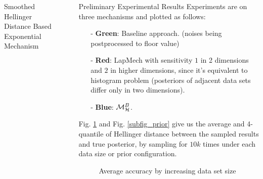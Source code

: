 \documentclass[final,hyperref={pdfpagelabels=false}]{beamer}
\begin{document}
\begin{frame}[t]
\begin{columns}[t]
\begin{column}{.485\textwidth}
\begin{block}{Smoothed Hellinger Distance Based Exponential Mechanism}
\end{block}


\end{column} %

\begin{column}{.01\textwidth}\end{column} %
 
\begin{column}{.485\textwidth} %






\begin{block}{Preliminary Experimental Results}
Experiments are on three mechanisms and plotted as follows:
\begin{itemize}
  \item[-] \textbf{Green}: Baseline approach. (noises being postprocessed to floor value) %
  \item[-] \textbf{Red}: LapMech with sensitivity $1$ in 2 dimensions and $2$ in higher dimensions, since it's equivalent to histogram problem 
  (posteriors of adjacent data sets differ only in two dimensions).
  \item[-] \textbf{Blue}: $\mathcal{M}^{B}_{\mathcal{H}}$.
\end{itemize}
  Fig. \ref{fig_sampling} and Fig. \ref{subfig_prior} give us the average and 4-quantile of Hellinger distance between the sampled results and true posterior, by sampling for $10k$ times under each data size or prior configuration.

\begin{figure}[H]
\begin{center}
\centering
  \caption{Average accuracy by increasing data set size}
\label{fig_sampling}
\end{center}
\end{figure}


\end{block}
\end{column}
\end{columns}
\end{frame}
\end{document}

